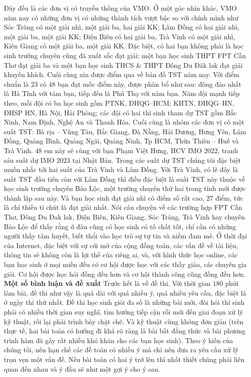 \begin{multicols}{2}
	Đây đều là các đơn vị có truyền thống của VMO. Ở một góc nhìn khác, VMO năm nay có những đơn vị có những thành tích vượt bậc so với chính mình như Sóc Trăng có một giải nhì, một giải ba, hai giải KK; Lâm Đồng có hai giải nhì, một giải ba, một giải KK; Điện Biên có hai giải ba, Trà Vinh có một giải nhì, Kiên Giang có một giải  ba, một giải KK. Đặc biệt, có hai bạn không phải là học sinh trường chuyên cũng đã xuất sắc đạt giải: một bạn học sinh THPT FPT Cần Thơ đạt giải ba và một bạn học sinh THCS \& THPT Đông Du Đăk lak đạt giải khuyến khích. 
	\vskip 0.1cm
	Cuối cùng xin được điểm qua về bản đồ TST năm nay. Với điểm chuẩn là $23$ có $48$ bạn đạt mốc điểm này, được phân bổ như sau: đông đảo nhất là Hà Tĩnh với tám bạn, tiếp đến là Phú Thọ với năm bạn. Năm đội mạnh tiếp theo, mỗi đội có ba học sinh gồm PTNK, ĐHQG--HCM; KHTN, ĐHQG--HN, ĐHSP HN, Hà Nội, Hải Phòng; các đội có hai thí sinh tham dự TST gồm Bắc Ninh, Nam Định, Nghệ An và Thanh Hóa. Cuối cùng là nhóm các đơn vị có một suất TST: Bà rịa -- Vũng Tàu, Bắc Giang, Đà Nẵng, Hải Dương, Hưng Yên, Lâm Đồng, Quảng Bình, Quảng Ngãi, Quảng Ninh, Tp HCM, Thừa Thiên -- Huế và Trà Vinh. $48$ em này sẽ cùng với bạn Phạm Việt Hưng, HCV IMO $2022$, tranh sáu suất dự IMO $2023$ tại Nhật Bản. 
	\vskip 0.1cm
	Trong các suất dự TST chúng tôi đặc biệt muốn nhắc tới hai suất của Trà Vinh và Lâm Đồng. Với Trà Vinh, có lẽ đây là suất TST đầu tiên còn với Lâm Đồng thì điều đặc biệt là suất TST này thuộc về học sinh trường chuyên Bảo Lộc, một trường chuyên thứ hai trong tỉnh mới được thành lập sau này. Và bạn học sinh đạt giải nhì có điểm số rất cao, $27$ điểm, tức là chỉ thiếu tí chút là đạt giải nhất.
	\vskip 0.1cm
	Nói câu chuyện về các trường hợp FPT Cần Thơ, Đông Du Đak lak, Điện Biên, Kiên Giang, Sóc Trăng, Trà Vinh hay chuyên Bảo Lộc để thấy rằng ở đâu cũng có học sinh có tố chất tốt, chỉ cần có những người thầy tâm huyết, biết thổi vào học trò sự tự tin và niềm đam mê. Ở thời đại của Internet, đặc biệt với sự cởi mở của cộng đồng toán, các vấn đề về tài liệu, thông tin sẽ không còn là lợi thế của riêng ai, và, với hình thức học online, các bạn học sinh ở mọi miền đều có cơ hội được học với các thầy giáo, các chuyên gia giỏi. Cơ hội được học hỏi đồng đều hơn và cơ hội thành công cũng đồng đều hơn.
	\vskip 0.1cm
	\textbf{\color{cackithi}Một số bình luận và đề xuất}
	\vskip 0.1cm
	Trước hết là về đề thi. Với thời gian $180$ phút làm bài, đề thi như vậy là quá dài với quá nhiều ý, quá nhiều yêu cầu, đặc biệt là ở ngày thi thứ nhất. Đề thi học sinh giỏi đa số là những bài mới, đòi hỏi thí sinh phải có nhiều thời gian suy nghĩ, tìm hướng tiếp cận rồi mới đến giai đoạn xử lý kỹ thuật, rồi lại phải trình bày chặt chẽ. Và kỹ thuật cũng không đơn giản (trên thực tế, hai bài toán có hướng đi khá rõ ràng là bài bất đẳng thức và bài phương trình hàm đã gây rất nhiều khó khăn cho các bạn học sinh). Theo ý kiến của chúng tôi, nên hạn chế các đề toán có nhiều ý mà chỉ nên đưa ra yêu cầu xử lý trọn vẹn một vấn đề. Nếu bài toán có hai ý trở lên thì nhất thiết chúng phải liên quan đến nhau và ý đầu sẽ như một gợi ý cho ý sau.

\end{multicols}
